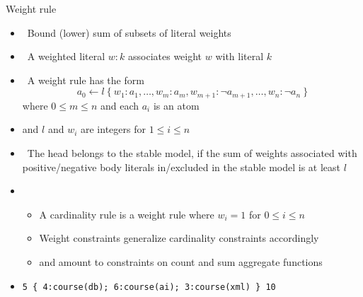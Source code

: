 \begin{frame}[fragile]{Weight rule}
  \label{eqn:weight:rule}
  \begin{itemize}
  \item<only@1-2>  \ Bound (lower) sum of subsets of literal weights
  \item {} \ A \alert{weighted literal} $w:k$ associates weight $w$ with literal $k$
  \item {} \ A \alert{weight rule} has the form
    \[
      a_0\leftarrow l~\{\ w_1:a_1,\dots,w_m:a_m,w_{m+1}:\neg a_{m+1},\dots,w_n:\neg a_n\ \}
    \]
    where $0\leq m\leq n$ and each $a_i$ is an atom
  \item [] and $l$ and $w_i$ are integers for $1\leq i\leq n$
    \smallskip
  \item<only@2>  \
    The head belongs to the stable model,
    if the sum of weights associated with positive/negative body literals in/excluded in the stable model
    is at least $l$

  \item<only@3-> 
    \begin{itemize}\normalsize
    \item A cardinality rule is a weight rule where $w_i=1$  for $0\leq i\leq n$
    \item<only@4-> Weight constraints generalize cardinality constraints accordingly
    \item<only@4->[] and amount to constraints on count and sum aggregate functions
    \end{itemize}

  \item<only@5-> 
\begin{lstlisting}[basicstyle=\ttfamily\small]
5 { 4:course(db); 6:course(ai); 3:course(xml) } 10
\end{lstlisting}
  \end{itemize}
\end{frame}
%
